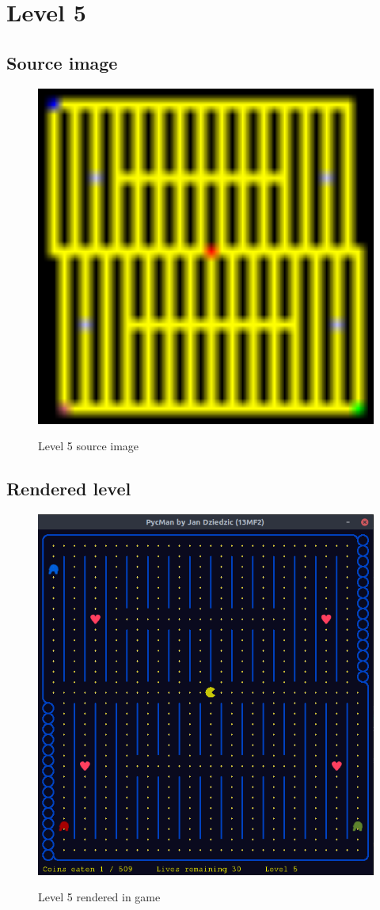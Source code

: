 \documentclass[11pt,a4paper,notitlepage]{report}
\newcommand{\dsubsection}[1]{\FloatBarrier \subsection{#1}}
\newenvironment{img}{
	\begin{center}
		\begin{figure}[H]
			\begin{center}
			
}{
	\end{center}
		\end{figure}
			\end{center}
}
\begin{document}
		\section{Level 5}
			\dsubsection{Source image}
			\begin{img}
				\includegraphics[width=350pt]{images/level5}\\
				\caption{Level 5 source image}
			\end{img}
			\dsubsection{Rendered level}
			\begin{img}
				\includegraphics[width=350pt]{images/level5_r}\\
				\caption{Level 5 rendered in game}
			\end{img}
\end{document}

